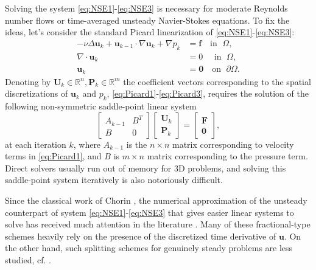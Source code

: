 \documentclass[3p]{elsarticle}
\def\V#1{\mathbf{#1}}
\begin{document}
Solving the system \eqref{eq:NSE1}-\eqref{eq:NSE3} is necessary for moderate Reynolds number flows or time-averaged unsteady Navier-Stokes equations. To fix the ideas, let's consider the standard Picard linearization \cite{GirRav1986} of \eqref{eq:NSE1}-\eqref{eq:NSE3}: 
\begin{align}
- \nu\Delta \V{u}_k 
+ \V{u}_{k-1} \cdot \nabla \V{u}_k + \nabla p_k  &= \V{f}  \quad \text{in } \; \Omega, \label{eq:Picard1} \\
\nabla \cdot \V{u}_k &= 0  \quad \text{ in } \; \Omega, \label{eq:Picard2} \\
\V{u}_k & = \V{0} \quad \text{on } \; \partial \Omega.
\label{eq:Picard3}
\end{align}
Denoting by $\V{U}_k \in \mathbb{R}^n, \V{P}_k \in \mathbb{R}^m$ the coefficient vectors corresponding to the spatial discretizations of $\V{u}_k$ and $p_k$, \eqref{eq:Picard1}-\eqref{eq:Picard3}, requires the solution of the following non-symmetric saddle-point linear system
\begin{equation}\label{eq:PicardSystem1}
\begin{bmatrix} 
A_{k-1} & B^T \\ 
B &   0
\end{bmatrix}
\begin{bmatrix} \V{U}_k  \\ 
\V{P}_k  
\end{bmatrix}
= \begin{bmatrix} \V{F} \\ \V{0} \end{bmatrix},
\end{equation}
at each iteration $k$, where $A_{k-1}$ is the $n \times n$ matrix corresponding to velocity terms in \eqref{eq:Picard1}, and $B$ is $m \times n$ matrix corresponding to the pressure term. Direct solvers usually run out of memory for 3D problems, and solving this saddle-point system iteratively is also notoriously difficult. 

Since the classical work of Chorin \cite{Cho1968}, the numerical approximation of the unsteady counterpart of system \eqref{eq:NSE1}-\eqref{eq:NSE3} that gives easier linear systems to solve has received much attention in the literature  \cite{Gue2009,GueMinShe2006a}. Many of these fractional-type schemes heavily rely on the presence of the discretized time derivative of $\V{u}$. On the other hand, such splitting schemes for genuinely steady problems are less studied, cf. \cite{chen17,TC23,GEREDELI2023114920}. 
\end{document}
